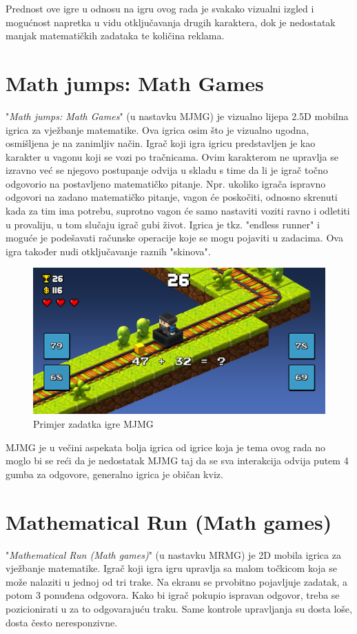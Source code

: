 \documentclass[times, utf8, zavrsni]{fer}
\begin{document}
	 Prednost ove igre u odnosu na igru ovog rada je svakako vizualni izgled i mogućnost napretka u vidu otključavanja drugih karaktera, dok je nedostatak manjak matematičkih zadataka te količina reklama. 
		

	
	\section{Math jumps: Math Games}
	"\textit{Math jumps: Math Games}" (u nastavku MJMG) je vizualno lijepa 2.5D mobilna igrica za vježbanje matematike. Ova igrica osim što je vizualno ugodna, osmišljena je na zanimljiv način. Igrač koji igra igricu predstavljen je kao karakter
	u vagonu koji se vozi po tračnicama. Ovim karakterom ne upravlja se izravno već se njegovo postupanje odvija u skladu s time da li je igrač točno odgovorio na postavljeno matematičko pitanje. Npr. ukoliko igrača ispravno odgovori na zadano matematičko
	pitanje, vagon će poskočiti, odnosno skrenuti kada za tim ima potrebu, suprotno vagon će samo nastaviti voziti ravno i odletiti u provaliju, u tom slučaju igrač gubi život. Igrica je tkz. "endless runner" i moguće je podešavati računske operacije
	koje se mogu pojaviti u zadacima. Ova igra također nudi otključavanje raznih "skinova".
	
	\begin{figure}[H]
		\includegraphics[scale = 0.2]{"slike/igre/mathjumps.png"} 
		\centering
		\caption{Primjer zadatka igre MJMG}
		\label{fig:mjmg}
	\end{figure}
	
	MJMG je u večini aspekata bolja igrica od igrice koja je tema ovog rada no moglo bi se reći da je nedostatak MJMG taj da se sva interakcija odvija putem 4 gumba za odgovore, generalno igrica je običan kviz.
	
	
	\section{Mathematical Run (Math games)}
	"\textit{Mathematical Run (Math games)}" (u nastavku MRMG) je 2D mobila igrica za vježbanje matematike. Igrač koji igra igru upravlja sa malom točkicom koja se može nalaziti u jednoj od tri trake. Na ekranu se prvobitno pojavljuje zadatak, a potom 3
	ponuđena odgovora. Kako bi igrač pokupio ispravan odgovor, treba se pozicionirati u za to odgovarajuću traku. Same kontrole upravljanja su dosta loše, dosta često neresponzivne.
	
\end{document}
